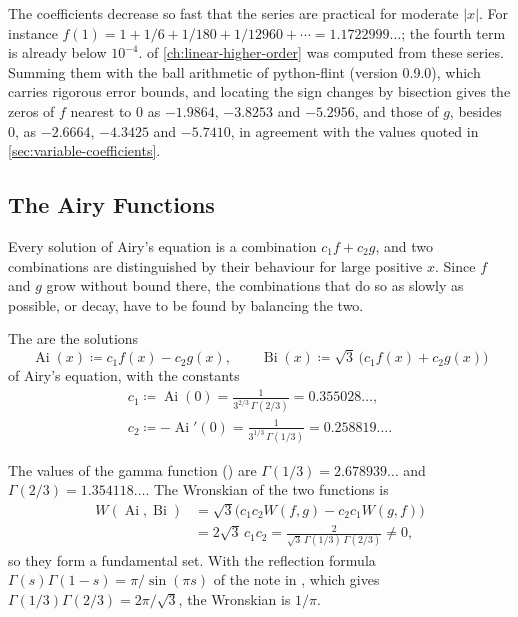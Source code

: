 The coefficients decrease so fast that the series are practical for moderate $|x|$. For instance $f(1)=1+1/6+1/180+1/12960+\cdots=1.1722999\ldots$; the fourth term is already below $10^{-4}$.  of \cref{ch:linear-higher-order} was computed from these series. Summing them with the ball arithmetic of python-flint (version 0.9.0), which carries rigorous error bounds, and locating the sign changes by bisection gives the zeros of $f$ nearest to $0$ as $-1.9864$, $-3.8253$ and $-5.2956$, and those of $g$, besides $0$, as $-2.6664$, $-4.3425$ and $-5.7410$, in agreement with the values quoted in \cref{sec:variable-coefficients}.

\subsection{The Airy Functions}

Every solution of Airy's equation is a combination $c_1f+c_2g$, and two combinations are distinguished by their behaviour for large positive $x$. Since $f$ and $g$ grow without bound there, the combinations that do so as slowly as possible, or decay, have to be found by balancing the two.

\begin{definition}
\label{def:airy-functions}
The  are the solutions
\[
\operatorname{Ai}(x)\coloneqq c_1f(x)-c_2g(x),\qquad\operatorname{Bi}(x)\coloneqq\sqrt3\,\bigl(c_1f(x)+c_2g(x)\bigr)
\]
of Airy's equation, with the constants
\begin{gather*}
c_1\coloneqq\operatorname{Ai}(0)=\frac1{3^{2/3}\,\Gamma(2/3)}=0.355028\ldots,\\
c_2\coloneqq-\operatorname{Ai}'(0)=\frac1{3^{1/3}\,\Gamma(1/3)}=0.258819\ldots .
\end{gather*}
\end{definition}

The values of the gamma function () are $\Gamma(1/3)=2.678939\ldots$ and $\Gamma(2/3)=1.354118\ldots$. The Wronskian of the two functions is
\begin{align*}
W(\operatorname{Ai},\operatorname{Bi})&=\sqrt3\bigl(c_1c_2W(f,g)-c_2c_1W(g,f)\bigr)\\
&=2\sqrt3\,c_1c_2=\frac{2}{\sqrt3\,\Gamma(1/3)\,\Gamma(2/3)}\ne0 ,
\end{align*}
so they form a fundamental set. With the reflection formula $\Gamma(s)\Gamma(1-s)=\pi/\sin(\pi s)$ of the note in , which gives $\Gamma(1/3)\Gamma(2/3)=2\pi/\sqrt3$, the Wronskian is $1/\pi$.

